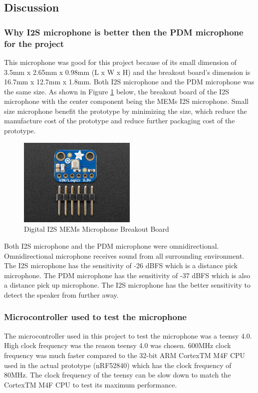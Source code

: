 \subsection{Discussion}
\subsubsection{Why I2S microphone is better then the PDM microphone for the project}
This microphone was good for this project because of its small dimension of 3.5mm x 2.65mm x 0.98mm (L x W x H) and the breakout board's dimension is 16.7mm x 12.7mm x 1.8mm. Both I2S microphone and the PDM microphone was the same size. As shown in Figure \ref{fig:I2S} below, the breakout board of the I2S microphone with the center component being the MEMs I2S microphone. Small size microphone benefit the prototype by minimizing the size, which reduce the manufacture cost of the prototype and reduce further packaging cost of the prototype. 
\begin{figure}[H]
	\centering
	\noindent\includegraphics[width=0.5\textwidth]{images/I2S.jpg}
	\caption{Digital I2S MEMs Microphone Breakout Board }
	\label{fig:I2S}
\end{figure}
Both I2S microphone and the PDM microphone were omnidirectional. Omnidirectional microphone receives sound from all surrounding environment. The I2S microphone has the sensitivity of -26 dBFS which is a distance pick microphone. The PDM microphone has the sensitivity of -37 dBFS which is also a distance pick up microphone. The I2S microphone has the better sensitivity to detect the speaker from further away.

\subsubsection{Microcontroller used to test the microphone}
The microcontroller used in this project to test the microphone was a teensy 4.0. High clock frequency was the reason teensy 4.0 was chosen. 600MHz clock frequency was much faster compared to the 32-bit ARM CortexTM M4F CPU used in the actual prototype (nRF52840) which has the clock frequency of 80MHz. The clock frequency of the teensy can be slow down to match the CortexTM M4F CPU to test its maximum performance. 

